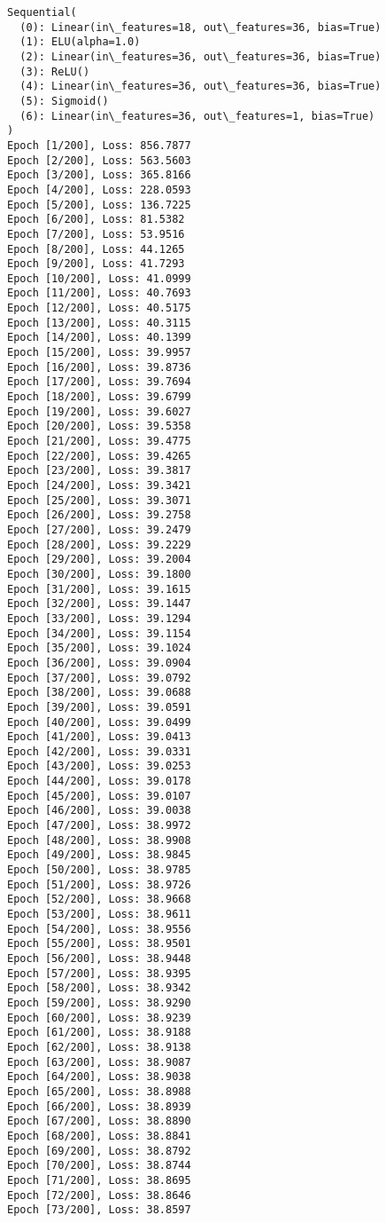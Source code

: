 \documentclass[11pt]{article}
\begin{document}
    \begin{Verbatim}[commandchars=\\\{\}]
Sequential(
  (0): Linear(in\_features=18, out\_features=36, bias=True)
  (1): ELU(alpha=1.0)
  (2): Linear(in\_features=36, out\_features=36, bias=True)
  (3): ReLU()
  (4): Linear(in\_features=36, out\_features=36, bias=True)
  (5): Sigmoid()
  (6): Linear(in\_features=36, out\_features=1, bias=True)
)
Epoch [1/200], Loss: 856.7877
Epoch [2/200], Loss: 563.5603
Epoch [3/200], Loss: 365.8166
Epoch [4/200], Loss: 228.0593
Epoch [5/200], Loss: 136.7225
Epoch [6/200], Loss: 81.5382
Epoch [7/200], Loss: 53.9516
Epoch [8/200], Loss: 44.1265
Epoch [9/200], Loss: 41.7293
Epoch [10/200], Loss: 41.0999
Epoch [11/200], Loss: 40.7693
Epoch [12/200], Loss: 40.5175
Epoch [13/200], Loss: 40.3115
Epoch [14/200], Loss: 40.1399
Epoch [15/200], Loss: 39.9957
Epoch [16/200], Loss: 39.8736
Epoch [17/200], Loss: 39.7694
Epoch [18/200], Loss: 39.6799
Epoch [19/200], Loss: 39.6027
Epoch [20/200], Loss: 39.5358
Epoch [21/200], Loss: 39.4775
Epoch [22/200], Loss: 39.4265
Epoch [23/200], Loss: 39.3817
Epoch [24/200], Loss: 39.3421
Epoch [25/200], Loss: 39.3071
Epoch [26/200], Loss: 39.2758
Epoch [27/200], Loss: 39.2479
Epoch [28/200], Loss: 39.2229
Epoch [29/200], Loss: 39.2004
Epoch [30/200], Loss: 39.1800
Epoch [31/200], Loss: 39.1615
Epoch [32/200], Loss: 39.1447
Epoch [33/200], Loss: 39.1294
Epoch [34/200], Loss: 39.1154
Epoch [35/200], Loss: 39.1024
Epoch [36/200], Loss: 39.0904
Epoch [37/200], Loss: 39.0792
Epoch [38/200], Loss: 39.0688
Epoch [39/200], Loss: 39.0591
Epoch [40/200], Loss: 39.0499
Epoch [41/200], Loss: 39.0413
Epoch [42/200], Loss: 39.0331
Epoch [43/200], Loss: 39.0253
Epoch [44/200], Loss: 39.0178
Epoch [45/200], Loss: 39.0107
Epoch [46/200], Loss: 39.0038
Epoch [47/200], Loss: 38.9972
Epoch [48/200], Loss: 38.9908
Epoch [49/200], Loss: 38.9845
Epoch [50/200], Loss: 38.9785
Epoch [51/200], Loss: 38.9726
Epoch [52/200], Loss: 38.9668
Epoch [53/200], Loss: 38.9611
Epoch [54/200], Loss: 38.9556
Epoch [55/200], Loss: 38.9501
Epoch [56/200], Loss: 38.9448
Epoch [57/200], Loss: 38.9395
Epoch [58/200], Loss: 38.9342
Epoch [59/200], Loss: 38.9290
Epoch [60/200], Loss: 38.9239
Epoch [61/200], Loss: 38.9188
Epoch [62/200], Loss: 38.9138
Epoch [63/200], Loss: 38.9087
Epoch [64/200], Loss: 38.9038
Epoch [65/200], Loss: 38.8988
Epoch [66/200], Loss: 38.8939
Epoch [67/200], Loss: 38.8890
Epoch [68/200], Loss: 38.8841
Epoch [69/200], Loss: 38.8792
Epoch [70/200], Loss: 38.8744
Epoch [71/200], Loss: 38.8695
Epoch [72/200], Loss: 38.8646
Epoch [73/200], Loss: 38.8597

\end{Verbatim}
\end{document}
